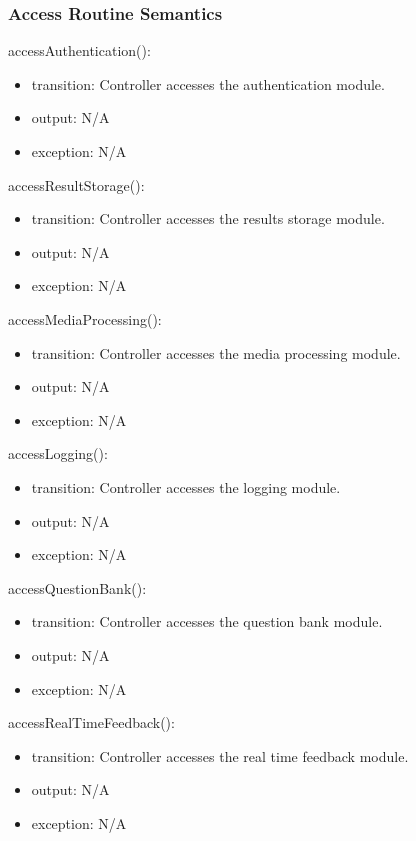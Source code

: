 \documentclass[12pt, titlepage]{article}
\begin{document}
\subsubsection{Access Routine Semantics}

\noindent accessAuthentication():
\begin{itemize}
\item transition: Controller accesses the authentication module.
\item output: N/A
\item exception: N/A
\end{itemize}

\noindent accessResultStorage():
\begin{itemize}
\item transition: Controller accesses the results storage module.
\item output: N/A
\item exception: N/A
\end{itemize}

\noindent accessMediaProcessing():
\begin{itemize}
\item transition: Controller accesses the media processing module.
\item output: N/A
\item exception: N/A
\end{itemize}

\noindent accessLogging():
\begin{itemize}
\item transition: Controller accesses the logging module.
\item output: N/A
\item exception: N/A
\end{itemize}

\noindent accessQuestionBank():
\begin{itemize}
\item transition: Controller accesses the question bank module.
\item output: N/A
\item exception: N/A
\end{itemize}

\noindent accessRealTimeFeedback():
\begin{itemize}
\item transition: Controller accesses the real time feedback module.
\item output: N/A
\item exception: N/A
\end{itemize}
\end{document}
